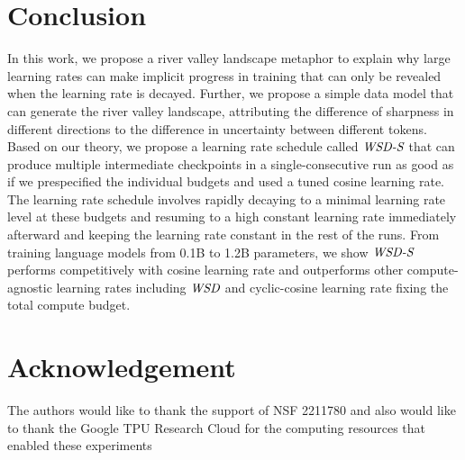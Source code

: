 \section{Conclusion}

In this work, we propose a river valley landscape metaphor to explain why large learning rates can make implicit progress in training that can only be revealed when the learning rate is decayed. Further, we propose a simple data model that can generate the river valley landscape, attributing the difference of sharpness in different directions to the difference in uncertainty between different tokens. Based on our theory, we propose a learning rate schedule called $\textit{WSD-S}$ that can produce multiple intermediate checkpoints in a single-consecutive run as good as if we prespecified the individual budgets and used a tuned cosine learning rate. The learning rate schedule involves rapidly decaying to a minimal learning rate level at these budgets and resuming to a high constant learning rate immediately afterward and keeping the learning rate constant in the rest of the runs. From training language models from 0.1B to 1.2B parameters, we show $\textit{WSD-S}$ performs competitively with cosine learning rate and outperforms other compute-agnostic learning rates including $\textit{WSD}$ and cyclic-cosine learning rate fixing the total compute budget.

\section*{Acknowledgement}

The authors would like to thank the support of NSF 2211780 and also would like to thank the Google TPU Research Cloud for the computing resources that enabled these experiments